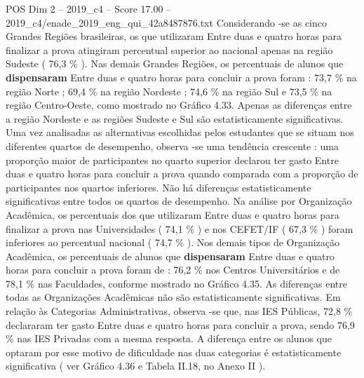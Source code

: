 \begin{textsample}{POS Dim 2 – 2019\_c4 – Score 17.00 – 2019\_c4/enade\_2019\_eng\_qui\_42a8487876.txt}
Considerando -se as cinco Grandes Regiões brasileiras, os que utilizaram Entre duas e quatro horas para finalizar a prova atingiram percentual superior ao nacional apenas na região Sudeste ( 76,3 \% ).
Nas demais Grandes Regiões, os percentuais de alunos que \textbf{dispensaram} Entre duas e quatro horas para concluir a prova foram : 73,7 \% na região Norte ; 69,4 \% na região Nordeste ; 74,6 \% na região Sul e 73,5 \% na região Centro-Oeste, como mostrado no Gráfico 4.33.
Apenas as diferenças entre a região Nordeste e as regiões Sudeste e Sul são estatisticamente significativas.
Uma vez analisadas as alternativas escolhidas pelos estudantes que se situam nos diferentes quartos de desempenho, observa -se uma tendência crescente : uma proporção maior de participantes no quarto superior declarou ter gasto Entre duas e quatro horas para concluir a prova quando comparada com a proporção de participantes nos quartos inferiores.
Não há diferenças estatisticamente significativas entre todos os quartos de desempenho.
Na análise por Organização Acadêmica, os percentuais dos que utilizaram Entre duas e quatro horas para finalizar a prova nas Universidades ( 74,1 \% ) e nos CEFET/IF ( 67,3 \% ) foram inferiores ao percentual nacional ( 74,7 \% ).
Nos demais tipos de Organização Acadêmica, os percentuais de alunos que \textbf{dispensaram} Entre duas e quatro horas para concluir a prova foram de : 76,2 \% nos Centros Universitários e de 78,1 \% nas Faculdades, conforme mostrado no Gráfico 4.35.
As diferenças entre todas as Organizações Acadêmicas não são estatisticamente significativas.
Em relação às Categorias Administrativas, observa -se que, nas IES Públicas, 72,8 \% declararam ter gasto Entre duas e quatro horas para concluir a prova, sendo 76,9 \% nas IES Privadas com a mesma resposta.
A diferença entre os alunos que optaram por esse motivo de dificuldade nas duas categorias é estatisticamente significativa ( ver Gráfico 4.36 e Tabela II.18, no Anexo II ).

\end{textsample}
